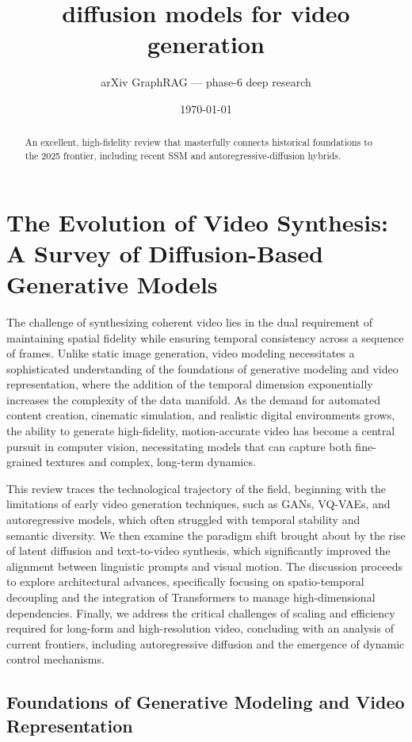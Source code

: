 \documentclass[11pt]{article}
\title{diffusion models for video generation}
\author{arXiv GraphRAG --- phase-6 deep research}
\date{\today}
\begin{document}
\maketitle

\begin{abstract}
An excellent, high-fidelity review that masterfully connects historical foundations to the 2025 frontier, including recent SSM and autoregressive-diffusion hybrids.
\end{abstract}

\section{The Evolution of Video Synthesis: A Survey of Diffusion-Based Generative Models}

The challenge of synthesizing coherent video lies in the dual requirement of maintaining spatial fidelity while ensuring temporal consistency across a sequence of frames. Unlike static image generation, video modeling necessitates a sophisticated understanding of the foundations of generative modeling and video representation, where the addition of the temporal dimension exponentially increases the complexity of the data manifold. As the demand for automated content creation, cinematic simulation, and realistic digital environments grows, the ability to generate high-fidelity, motion-accurate video has become a central pursuit in computer vision, necessitating models that can capture both fine-grained textures and complex, long-term dynamics.

This review traces the technological trajectory of the field, beginning with the limitations of early video generation techniques, such as GANs, VQ-VAEs, and autoregressive models, which often struggled with temporal stability and semantic diversity. We then examine the paradigm shift brought about by the rise of latent diffusion and text-to-video synthesis, which significantly improved the alignment between linguistic prompts and visual motion. The discussion proceeds to explore architectural advances, specifically focusing on spatio-temporal decoupling and the integration of Transformers to manage high-dimensional dependencies. Finally, we address the critical challenges of scaling and efficiency required for long-form and high-resolution video, concluding with an analysis of current frontiers, including autoregressive diffusion and the emergence of dynamic control mechanisms.

\subsection{Foundations of Generative Modeling and Video Representation}
\end{document}
